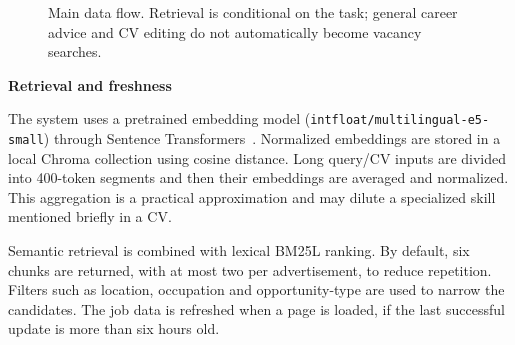 \documentclass[a4paper,10pt]{article}
\begin{document}
\begin{figure}[H]
\centering
{}
\caption{Main data flow. Retrieval is conditional on the task; general career advice and CV editing do not automatically become vacancy searches.}
\label{fig:architecture}
\end{figure}

\newpage
\textbf{Retrieval and freshness} 

The system uses a pretrained embedding model (\texttt{intfloat/multilingual-e5-small}) through Sentence Transformers\ \cite{e5}. Normalized embeddings are stored in a local Chroma collection using cosine distance. Long query/CV inputs are divided into 400-token segments and then their embeddings are averaged and normalized. This aggregation is a practical approximation and may dilute a specialized skill mentioned briefly in a CV.

Semantic retrieval is combined with lexical BM25L ranking. By default, six chunks are returned, with at most two per advertisement, to reduce repetition. Filters such as location, occupation and opportunity-type are used to narrow the candidates. The job data is refreshed when a page is loaded, if the last successful update is more than six hours old.
\end{document}
